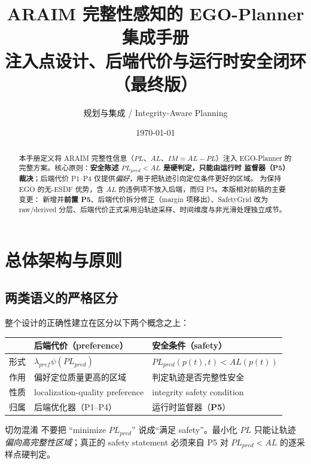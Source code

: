 \documentclass[11pt]{ctexart}
\title{\textbf{\color{accent}ARAIM 完整性感知的 EGO-Planner 集成手册}\\[4pt]
       \large 注入点设计、后端代价与运行时安全闭环（最终版）}
\author{规划与集成 / Integrity-Aware Planning}
\date{\today}
\begin{document}
\maketitle
\thispagestyle{fancy}

\begin{abstract}
\noindent 本手册定义将 ARAIM 完整性信息（$PL$、$AL$、$IM=AL-PL$）注入 EGO-Planner
的完整方案。核心原则：\textbf{安全陈述 $PL_{pred}<AL$ 是硬判定，只能由运行时
监督器（P5）裁决}；后端代价 P1--P4 仅提供\emph{偏好}，用于把轨迹引向定位条件更好的区域。
为保持 EGO 的无-ESDF 优势，含 $AL$ 的违例项不放入后端，而归 P5。本版相对前稿的主要变更：
新增并\textbf{前置 P5}、后端代价拆分修正（margin 项移出）、SafetyGrid 改为
raw/derived 分层、后端代价正式采用沿轨迹采样、时间维度与非光滑处理独立成节。
\end{abstract}

\tableofcontents
\bigskip

\section{总体架构与原则}

\subsection{两类语义的严格区分}
整个设计的正确性建立在区分以下两个概念之上：

\begin{center}\renewcommand{\arraystretch}{1.35}
\begin{tabular}{@{}p{4.3cm}p{4.8cm}p{4.6cm}@{}}
\toprule
 & \textbf{后端代价（preference）} & \textbf{安全条件（safety）}\\
\midrule
形式 & $\lambda_{pref}\psi(PL_{pred})$ & $PL_{pred}(p(t),t)<AL(p(t))$\\
作用 & 偏好定位质量更高的区域 & 判定轨迹是否完整性安全\\
性质 & localization-quality preference & integrity safety condition\\
归属 & 后端优化器（P1--P4） & 运行时监督器（\textbf{P5}）\\
\bottomrule
\end{tabular}\end{center}

\begin{warnbox}{切勿混淆}
不要把 ``minimize $PL_{pred}$'' 说成``满足 safety''。最小化 $PL$ 只能让轨迹
\emph{偏向高完整性区域}；真正的 safety statement 必须来自 P5 对
$PL_{pred}<AL$ 的逐采样点硬判定。
\end{warnbox}
\end{document}
